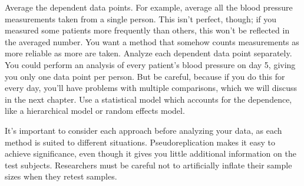     Average the dependent data points. For example, average all the blood pressure measurements taken from a single person. This isn’t perfect, though; if you measured some patients more frequently than others, this won’t be reflected in the averaged number. You want a method that somehow counts measurements as more reliable as more are taken.
    Analyze each dependent data point separately. You could perform an analysis of every patient’s blood pressure on day 5, giving you only one data point per person. But be careful, because if you do this for every day, you’ll have problems with multiple comparisons, which we will discuss in the next chapter.
    Use a statistical model which accounts for the dependence, like a hierarchical model or random effects model.

It’s important to consider each approach before analyzing your data, as each method is suited to different situations. Pseudoreplication makes it easy to achieve significance, even though it gives you little additional information on the test subjects. Researchers must be careful not to artificially inflate their sample sizes when they retest samples.